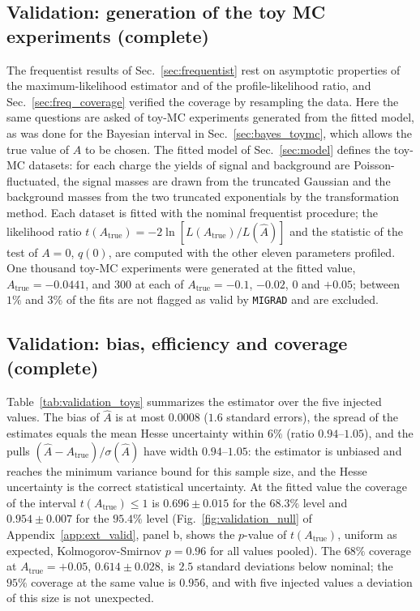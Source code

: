 \subsection{Validation: generation of the toy MC experiments (complete)}
The frequentist results of Sec.~\ref{sec:frequentist} rest on asymptotic properties of the maximum-likelihood estimator and of the profile-likelihood ratio, and Sec.~\ref{sec:freq_coverage} verified the coverage by resampling the data. Here the same questions are asked of toy-MC experiments generated from the fitted model, as was done for the Bayesian interval in Sec.~\ref{sec:bayes_toymc}, which allows the true value of $A$ to be chosen. The fitted model of Sec.~\ref{sec:model} defines the toy-MC datasets: for each charge the yields of signal and background are Poisson-fluctuated, the signal masses are drawn from the truncated Gaussian and the background masses from the two truncated exponentials by the transformation method. Each dataset is fitted with the nominal frequentist procedure; the likelihood ratio $t(A_{\mathrm{true}})=-2\ln[L(A_{\mathrm{true}})/L(\hat A)]$ and the statistic of the test of $A=0$, $q(0)$, are computed with the other eleven parameters profiled. One thousand toy-MC experiments were generated at the fitted value, $A_{\mathrm{true}}=-0.0441$, and $300$ at each of $A_{\mathrm{true}}=-0.1$, $-0.02$, $0$ and $+0.05$; between $1\%$ and $3\%$ of the fits are not flagged as valid by \texttt{MIGRAD} and are excluded.

\subsection{Validation: bias, efficiency and coverage (complete)}
Table~\ref{tab:validation_toys} summarizes the estimator over the five injected values. The bias of $\hat A$ is at most $0.0008$ ($1.6$ standard errors), the spread of the estimates equals the mean Hesse uncertainty within $6\%$ (ratio $0.94$--$1.05$), and the pulls $(\hat A-A_{\mathrm{true}})/\sigma(\hat A)$ have width $0.94$--$1.05$: the estimator is unbiased and reaches the minimum variance bound for this sample size, and the Hesse uncertainty is the correct statistical uncertainty. At the fitted value the coverage of the interval $t(A_{\mathrm{true}})\leq1$ is $0.696\pm0.015$ for the $68.3\%$ level and $0.954\pm0.007$ for the $95.4\%$ level (Fig.~\ref{fig:validation_null} of Appendix~\ref{app:ext_valid}, panel b, shows the $p$-value of $t(A_{\mathrm{true}})$, uniform as expected, Kolmogorov-Smirnov $p=0.96$ for all values pooled). The $68\%$ coverage at $A_{\mathrm{true}}=+0.05$, $0.614\pm0.028$, is $2.5$ standard deviations below nominal; the $95\%$ coverage at the same value is $0.956$, and with five injected values a deviation of this size is not unexpected.

